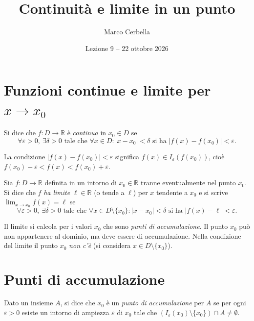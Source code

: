 \documentclass[11pt,a4paper]{article}
\title{Continuità e limite in un punto}
\author{Marco Cerbella}
\date{Lezione 9 -- 22 ottobre 2026}
\begin{document}
\maketitle

\section{Funzioni continue e limite per $x \to x_0$}

\begin{definizione}
Si dice che $f : D \to \mathbb{R}$ è \emph{continua} in $x_0 \in D$ se
\[
\forall \varepsilon > 0,\ \exists \delta > 0 \text{ tale che } \forall x \in D : |x - x_0| < \delta \text{ si ha } |f(x) - f(x_0)| < \varepsilon .
\]
\end{definizione}

La condizione $|f(x) - f(x_0)| < \varepsilon$ significa $f(x) \in I_\varepsilon(f(x_0))$, cioè $f(x_0) - \varepsilon < f(x) < f(x_0) + \varepsilon$.

\begin{definizione}
Sia $f : D \to \mathbb{R}$ definita in un intorno di $x_0 \in \mathbb{R}$ tranne eventualmente nel punto $x_0$. Si dice che $f$ \emph{ha limite} $\ell \in \mathbb{R}$ (o tende a $\ell$) per $x$ tendente a $x_0$ e si scrive $\displaystyle\lim_{x \to x_0} f(x) = \ell$ se
\[
\forall \varepsilon > 0,\ \exists \delta > 0 \text{ tale che } \forall x \in D \setminus \{x_0\} : |x - x_0| < \delta \text{ si ha } |f(x) - \ell| < \varepsilon .
\]
\end{definizione}

\begin{osservazione}
Il limite si calcola per i valori $x_0$ che sono \emph{punti di accumulazione}. Il punto $x_0$ può non appartenere al dominio, ma deve essere di accumulazione. Nella condizione del limite il punto $x_0$ \emph{non c'è} (si considera $x \in D \setminus \{x_0\}$).
\end{osservazione}

\section{Punti di accumulazione}

\begin{definizione}
Dato un insieme $A$, si dice che $x_0$ è un \emph{punto di accumulazione} per $A$ se per ogni $\varepsilon > 0$ esiste un intorno di ampiezza $\varepsilon$ di $x_0$ tale che $(I_\varepsilon(x_0) \setminus \{x_0\}) \cap A \neq \emptyset$.
\end{definizione}
\end{document}
